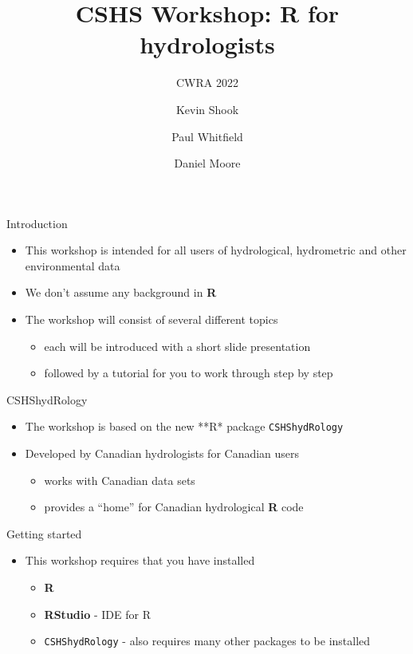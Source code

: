 \documentclass[
  ignorenonframetext,
  aspectratio=169]{beamer}
\title{CSHS Workshop: R for hydrologists}
\subtitle{CWRA 2022}
\author{Kevin Shook \and Paul Whitfield \and Daniel Moore}
\date{}
\institute{Canadian Society for Hydrological Sciences (CSHS)}
\providecommand{\tightlist}{%
  \setlength{\itemsep}{0pt}\setlength{\parskip}{0pt}}
\begin{document}
\frame{\titlepage}

\begin{frame}{Introduction}
\protect\hypertarget{introduction}{}
\begin{itemize}
\tightlist
\item
  This workshop is intended for all users of hydrological, hydrometric
  and other environmental data
\item
  We don't assume any background in \textbf{R}
\item
  The workshop will consist of several different topics

  \begin{itemize}
  \tightlist
  \item
    each will be introduced with a short slide presentation
  \item
    followed by a tutorial for you to work through step by step
  \end{itemize}
\end{itemize}
\end{frame}

\begin{frame}[fragile]{CSHShydRology}
\protect\hypertarget{cshshydrology}{}
\begin{itemize}
\tightlist
\item
  The workshop is based on the new **R* package \texttt{CSHShydRology}
\item
  Developed by Canadian hydrologists for Canadian users

  \begin{itemize}
  \tightlist
  \item
    works with Canadian data sets
  \item
    provides a ``home'' for Canadian hydrological \textbf{R} code
  \end{itemize}
\end{itemize}
\end{frame}

\begin{frame}[fragile]{Getting started}
\protect\hypertarget{getting-started}{}
\begin{itemize}
\tightlist
\item
  This workshop requires that you have installed

  \begin{itemize}
  \tightlist
  \item
    \textbf{R}
  \item
    \textbf{RStudio} - IDE for R
  \item
    \texttt{CSHShydRology} - also requires many other packages to be
    installed
  \end{itemize}
\end{itemize}
\end{frame}
\end{document}
